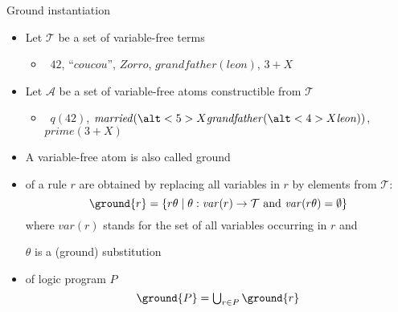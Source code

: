 \begin{frame}{Ground instantiation}

  \begin{itemize}
  \item<2-> Let $\mathcal{T}$ be a set of variable-free \alert<2-3>{terms}
    \smallskip
    \begin{itemize}\normalsize
    \item<only@3-5>  \ $42$, ``$\mathit{cou cou}$'', $\mathit{Zorro}$, $\mathit{grandfather}(\mathit{leon})$, $3+X$
    \end{itemize}
    \smallskip
  \item<2-> Let $\mathcal{A}$ be a set of variable-free \alert<2-3>{atoms} constructible from $\mathcal{T}$
    \smallskip
    \begin{itemize}\normalsize
    \item<only@3-5>  \ $q(42)$, $\mathit{married}(\alt<5>{X}{\mathit{grandfather}(\alt<4>{X}{\mathit{leon}})})$, $\mathit{prime}(3+X)$
    \end{itemize}
    \medskip
  \item<8-> A variable-free atom is also called \alert{ground}
    \medskip
  \item<9->  of a rule $r$ are obtained by
    replacing all variables in $r$ by elements from $\mathcal{T}$:
    \[
    \ground{r}=\{r\theta\mid\theta:\mathit{var}(r)\rightarrow \mathcal{T} \text{ and } \mathit{var}(r\theta)=\emptyset\}
    \]
    where $\mathit{var}(r)$ stands for the set of all variables occurring in $r$ and

    $\theta$ is a (ground) substitution
    \medskip
  \item<10->  of logic program $P$
    \[
    \ground{P}=\textstyle\bigcup_{r\in P}\ground{r}
    \]
  \end{itemize}
\end{frame}
%
